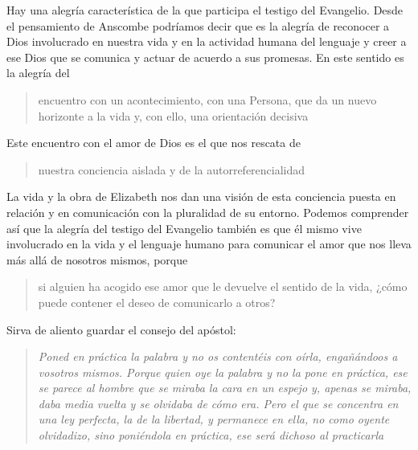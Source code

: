 \vspace{2.83334em}
\vspace{1.41667em}
Hay una alegría característica de la que participa el testigo del Evangelio. Desde el pensamiento de Anscombe podríamos decir que es la alegría de reconocer a Dios involucrado en nuestra vida y en la actividad humana del lenguaje y creer a ese Dios que se comunica y actuar de acuerdo a sus promesas. En este sentido es la alegría del \blockquote[][\,(DCE 1 ;EG 7)]{encuentro con un acontecimiento, con una Persona, que da un nuevo horizonte a la vida y, con ello, una orientación decisiva}. Este encuentro con el amor de Dios es el que nos rescata de \blockquote[][\,(EG 8)]{nuestra conciencia aislada y de la autorreferencialidad}. La vida y la obra de Elizabeth nos dan una visión de esta conciencia puesta en relación y en comunicación con la pluralidad de su entorno. Podemos comprender así que la alegría del testigo del Evangelio también es que él mismo vive involucrado en la vida y el lenguaje humano para comunicar el amor que nos lleva más allá de nosotros mismos, porque \blockquote[][\,(Ibíd.)]{si alguien ha acogido ese amor que le devuelve el sentido de la vida, ¿cómo puede contener el deseo de comunicarlo a otros?} Sirva de aliento guardar el consejo del apóstol: \blockquote[][\,(St 1, 22-25)]{\emph{Poned en práctica la palabra y no os contentéis con oírla, engañándoos a vosotros mismos. Porque quien oye la palabra y no la pone en práctica, ese se parece al hombre que se miraba la cara en un espejo y, apenas se miraba, daba media vuelta y se olvidaba de cómo era. Pero el que se concentra en una ley perfecta, la de la libertad, y permanece en ella, no como oyente olvidadizo, sino poniéndola en práctica, ese será dichoso al practicarla}}.
